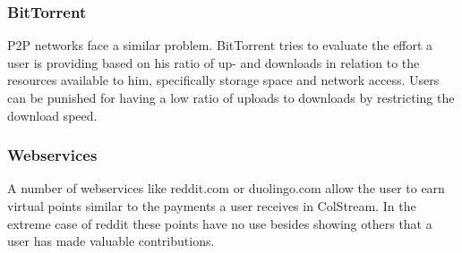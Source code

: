 \subsubsection{BitTorrent}
P2P networks face a similar problem. BitTorrent tries to evaluate the effort a user is providing based on his ratio of up- and downloads in relation to the resources available to him, specifically storage space and network access. Users can be punished for having a low ratio of uploads to downloads by restricting the download speed\cite{cohen2003incentives}.
\subsubsection{Webservices}
A number of webservices like reddit.com or duolingo.com allow the user to earn virtual points similar to the payments a user receives in ColStream. In the extreme case of reddit these points have no use besides showing others that a user has made valuable contributions. 






%
%
